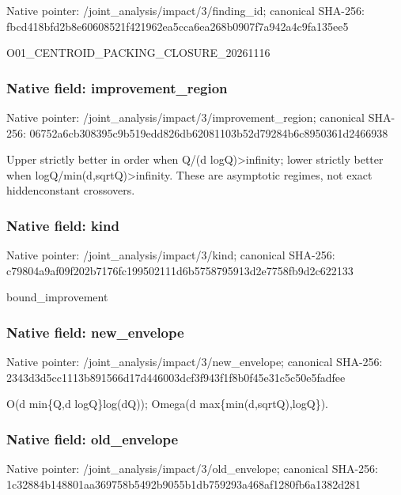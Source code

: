 \documentclass[10pt,a4paper]{article}
\begin{document}
Native pointer: /joint\_analysis/impact/3/finding\_id; canonical SHA-256: fbcd418bfd2b8e60608521f4\allowbreak{}21962ea5cca6ea268b0907f7\allowbreak{}a942a4c9fa135ee5


O01\_CENTROID\_PACKING\_CLOSURE\_20261116


\subsubsection{Native field: improvement\_region}


Native pointer: /joint\_analysis/impact/3\allowbreak{}/improvement\_region; canonical SHA-256: 06752a6cb308395c9b519edd\allowbreak{}826db62081103b52d79284b6\allowbreak{}c8950361d2466938


Upper strictly better in order when Q/(d logQ)>infinity; lower strictly better when logQ/min(d,sqrtQ)>infinity. These are asymptotic regimes, not exact hiddenconstant crossovers.


\subsubsection{Native field: kind}


Native pointer: /joint\_analysis/impact/3/kind; canonical SHA-256: c79804a9af09f202b7176fc1\allowbreak{}99502111d6b5758795913d2e\allowbreak{}7758fb9d2c622133


bound\_improvement


\subsubsection{Native field: new\_envelope}


Native pointer: /joint\_analysis/impact/3/new\_envelope; canonical SHA-256: 2343d3d5cc1113b891566d17\allowbreak{}d446003dcf3f943f1f8b0f45\allowbreak{}e31c5c50e5fadfee


O(d min\{Q,d logQ\}log(dQ)); Omega(d max\{min(d,sqrtQ),logQ\}).


\subsubsection{Native field: old\_envelope}


Native pointer: /joint\_analysis/impact/3/old\_envelope; canonical SHA-256: 1c32884b148801aa369758b5\allowbreak{}492b9055b1db759293a468af\allowbreak{}1280fb6a1382d281
\end{document}
